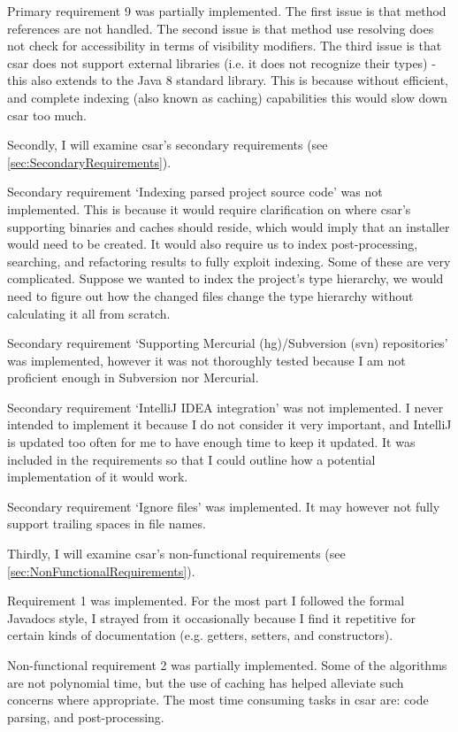 \documentclass[12pt, letterpaper]{article}
\begin{document}
Primary requirement 9 was partially implemented. The first issue is that method references are not handled.
The second issue is that method use resolving does not check for accessibility in terms of visibility modifiers.
The third issue is that csar does not support external libraries (i.e. it does not recognize their types) - this also extends to the Java 8 standard library.
This is because without efficient, and complete indexing (also known as caching) capabilities this would slow down csar too much.

Secondly, I will examine csar's secondary requirements (see \ref{sec:SecondaryRequirements}).

Secondary requirement `Indexing parsed project source code' was not implemented.
This is because it would require clarification on where csar's supporting binaries and caches should reside, which would imply that an installer would need to be created.
It would also require us to index post-processing, searching, and refactoring results to fully exploit indexing.
Some of these are very complicated.
Suppose we wanted to index the project's type hierarchy, we would need to figure out how the changed files change the type hierarchy without calculating it all from scratch.

Secondary requirement `Supporting Mercurial (hg)/Subversion (svn) repositories' was implemented, however it was not thoroughly tested because I am not proficient enough in Subversion nor Mercurial.

Secondary requirement `IntelliJ IDEA integration' was not implemented.
I never intended to implement it because I do not consider it very important, and IntelliJ is updated too often for me to have enough time to keep it updated.
It was included in the requirements so that I could outline how a potential implementation of it would work.

Secondary requirement `Ignore files' was implemented.
It may however not fully support trailing spaces in file names.

Thirdly, I will examine csar's non-functional requirements (see \ref{sec:NonFunctionalRequirements}).

Requirement 1 was implemented.
For the most part I followed the formal Javadocs style, I strayed from it occasionally because I find it repetitive for certain kinds of documentation (e.g. getters, setters, and constructors).

Non-functional requirement 2 was partially implemented.
Some of the algorithms are not polynomial time, but the use of caching has helped alleviate such concerns where appropriate.
The most time consuming tasks in csar are: code parsing, and post-processing.
\end{document}
